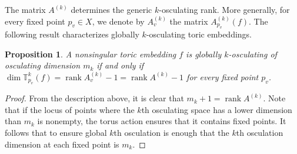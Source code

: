 \documentclass[11pt,reqno]{amsart}
\numberwithin{equation}{section}
\theoremstyle{plain}
\numberwithin{theorem}{section}
\newtheorem{proposition}[theorem]{Proposition}
\theoremstyle{definition}
\newcommand{\T}{\mathbb{T}}
\newcommand{\rank}{\operatorname{rank}}
\begin{document}
The matrix $A^{(k)}$ determines the generic $k$-osculating rank. More generally, for every fixed point $p_v\in X$, we denote by $A_v^{(k)}$ the matrix $A_{p_v}^{(k)}(f)$. The following result characterizes globally $k$-osculating toric embeddings. 

\begin{proposition}\label{prop: characterization of globally osculating toric varieties}
A nonsingular toric embedding $f$ is globally $k$-osculating of osculating dimension $m_k$ if and only if $\dim\T_{p_v}^k(f)=\rank A_v^{(k)}-1=\rank A^{(k)}-1$ for every fixed point $p_v$.
\end{proposition}
\begin{proof}
From the description above, it is clear that $m_k+1=\rank A^{(k)}.$ Note that if the locus of points where the $k$th osculating space has a lower dimension than $m_k$ is nonempty, the torus action ensures that it contains fixed points. It follows that to ensure global $k$th osculation is enough that the $k$th osculation dimension at each fixed point is $m_k.$
\end{proof}  
\end{document}

